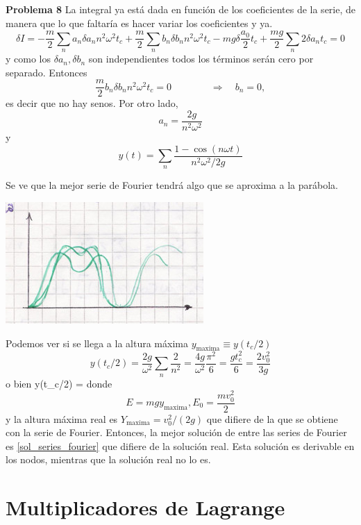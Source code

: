 \documentclass[10pt,oneside]{CBFT_book}
\begin{document}
\begin{ejemplo}{\bf Problema 8}
La integral ya está dada en función de los coeficientes de la serie, de manera que lo que faltaría es hacer variar los coeficientes y ya.
\[
	\delta I = - \frac m 2 \sum_n a_n \delta a_n n^2 \omega^2 t_c + \frac m 2 \sum_n b_n \delta b_n n^2 \omega^2 t_c -
	m g \delta \frac {a_0} 2 t_c + \frac{mg }{2} \sum_n 2 \delta a_n t_c = 0
\]
y como los $\delta a_n, \delta b_n$ son independientes todos los términos serán cero por separado.
Entonces
\[
	\frac m 2 b_n \delta b_n n^2 \omega^2 t_c = 0 \qquad \qquad \Rightarrow \quad b_n= 0,
\]
es decir que no hay senos. Por otro lado,
\[
	a_n  = \frac {2g}{n^2\omega^2}
\]
y
\[
	y(t) = \sum_n \frac{1-\cos(n\omega t)}{n^2\omega^2/2g}
\]

Se ve que la mejor serie de Fourier tendrá algo que se aproxima a la parábola.

\includegraphics[scale=0.3]{images/fig_mc_fourier_3.jpg}

Podemos ver si se llega a la altura máxima $y_\text{maxima} \equiv y(t_c/2)$
\[
	y(t_c/2) = \frac{2g}{\omega^2}\sum_n \frac{2}{n^2} = \frac{4g}{\omega^2}\frac{\pi^2}{6} = \frac{gt_c^2}{6} = \frac{2v_0^2}{3g}
\]
o bien 
\be
	y(t_c/2) = 
	\label{sol_series_fourier}
\ee
donde 
\[
	E = mgy_\text{maxima}, E_0 = \frac{mv_0^2}{2}
\]
y la altura máxima real es $Y_\text{maxima} = v_0^2/(2g)$ que difiere de la que se obtiene con la serie de Fourier.
Entonces, la mejor solución de entre las series de Fourier es \eqref{sol_series_fourier} que difiere de la solución real.
Esta solución es derivable en los nodos, mientras que la solución real no lo es.
\end{ejemplo}

\section{Multiplicadores de Lagrange}
\end{document}
